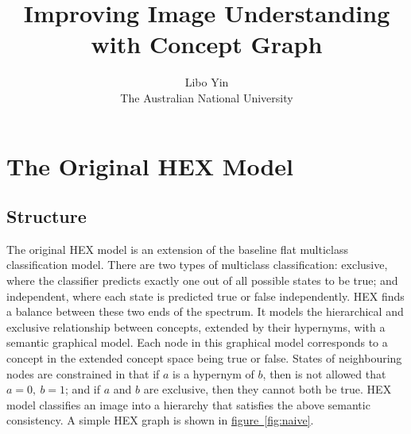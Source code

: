 \documentclass[11pt,a4paper]{article}
\begin{document}
\title{Improving Image Understanding with Concept Graph}
\author{Libo Yin\\The Australian National University}
\maketitle
\section{The Original HEX Model}
\subsection{Structure}

The original HEX model \cite{deng2014large} is an extension of the baseline flat multiclass classification model. There are two types of multiclass classification: exclusive, where the classifier predicts exactly one out of all possible states to be true; and independent, where each state is predicted true or false independently. HEX finds a balance between these two ends of the spectrum. It models the hierarchical and exclusive relationship between concepts, extended by their hypernyms, with a semantic graphical model. Each node in this graphical model corresponds to a concept in the extended concept space being true or false. States of neighbouring nodes are constrained in that if $a$ is a hypernym of $b$, then is not allowed that $a=0,\ b=1$; and if $a$ and $b$ are exclusive, then they cannot both be true. HEX model classifies an image into a hierarchy that satisfies the above semantic consistency. A simple HEX graph is shown in \hyperref[fig:naive]{figure~\ref{fig:naive}}.
\end{document}
